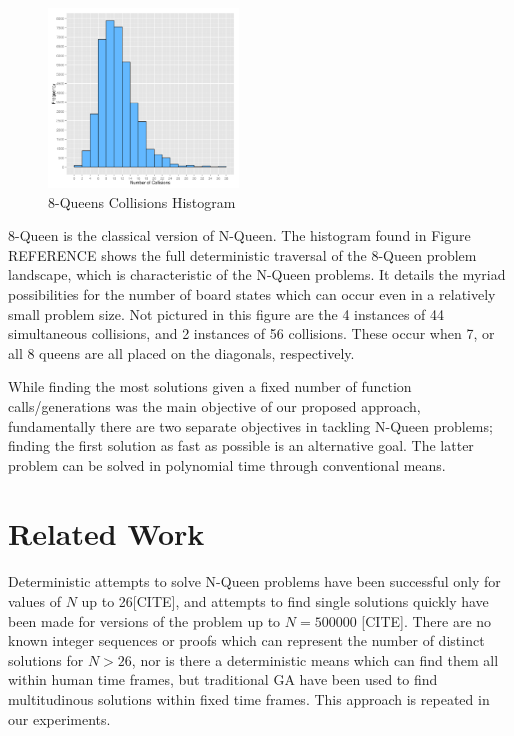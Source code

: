 \documentclass[conference]{IEEEtran}
\begin{document}
\begin{figure}[h!]
\centering
\includegraphics[width=0.45\textwidth]{8_queens_histogram.png}
\vspace{-12pt}
\caption{8-Queens Collisions Histogram}
\label{fig:histogram}
\end{figure}


8-Queen is the classical version of N-Queen. The histogram found in Figure {REFERENCE} shows the full deterministic traversal of the 8-Queen problem landscape, which is characteristic of the N-Queen problems. It details the myriad possibilities for the number of board states which can occur even in a relatively small problem size. Not pictured in this figure are the 4 instances of 44 simultaneous collisions, and 2 instances of 56 collisions. These occur when 7, or all 8 queens are all placed on the diagonals, respectively. 

While finding the most solutions given a fixed number of function calls/generations was the main objective of our proposed approach, fundamentally there are two separate objectives in tackling N-Queen problems; finding the first solution as fast as possible is an alternative goal. The latter problem can be solved in polynomial time through conventional means.

\section{Related Work}
Deterministic attempts to solve N-Queen problems have been successful only for values of $N$ up to 26[CITE], and attempts to find single solutions quickly have been made for versions of the problem up to {$N = 500000$} [CITE]. There are no known integer sequences or proofs which can represent the number of distinct solutions for $N > 26$, nor is there a deterministic means which can find them all within human time frames, but traditional GA have been used to find multitudinous solutions within fixed time frames. This approach is repeated in our experiments.
\end{document}
